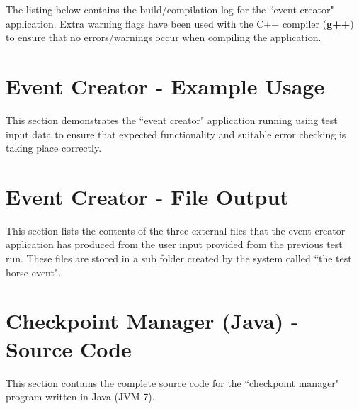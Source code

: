 \documentclass[a4paper, 10pt]{article}
\begin{document}
The listing below contains the build/compilation log for the ``event creator" application. Extra warning flags have been used with the C++ compiler (\textbf{g++}) to ensure that no errors/warnings occur when compiling the application.



\clearpage
\section{Event Creator - Example Usage}
This section demonstrates the ``event creator" application running using test input data to ensure that expected functionality and suitable error checking is taking place correctly.



\clearpage
\section{Event Creator - File Output}

This section lists the contents of the three external files that the event creator application has produced from the user input provided from the previous test run. These files are stored in a sub folder created by the system called ``the test horse event".







\clearpage
\section{Checkpoint Manager (Java) - Source Code}
This section contains the complete source code for the ``checkpoint manager" program written in Java (JVM 7).
\end{document}
